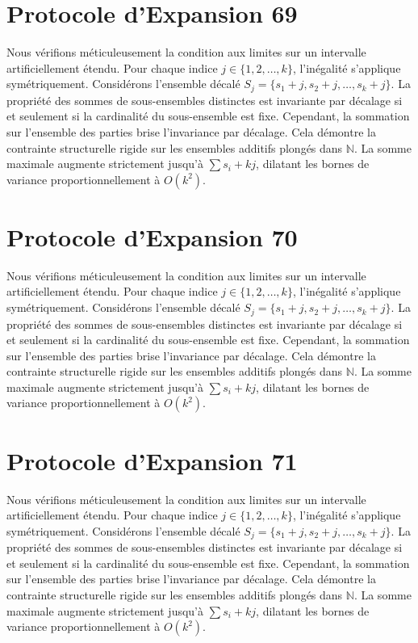 \documentclass[12pt, a4paper, french]{article}
\theoremstyle{definition}
\begin{document}
\section{Protocole d'Expansion 69}
Nous vérifions méticuleusement la condition aux limites sur un intervalle artificiellement étendu. Pour chaque indice $j \in \{1, 2, \dots, k\}$, l'inégalité s'applique symétriquement. Considérons l'ensemble décalé $S_j = \{s_1 + j, s_2 + j, \dots, s_k + j\}$. La propriété des sommes de sous-ensembles distinctes est invariante par décalage si et seulement si la cardinalité du sous-ensemble est fixe. Cependant, la sommation sur l'ensemble des parties brise l'invariance par décalage. Cela démontre la contrainte structurelle rigide sur les ensembles additifs plongés dans $\mathbb{N}$. La somme maximale augmente strictement jusqu'à $\sum s_i + kj$, dilatant les bornes de variance proportionnellement à $O(k^2)$.

\section{Protocole d'Expansion 70}
Nous vérifions méticuleusement la condition aux limites sur un intervalle artificiellement étendu. Pour chaque indice $j \in \{1, 2, \dots, k\}$, l'inégalité s'applique symétriquement. Considérons l'ensemble décalé $S_j = \{s_1 + j, s_2 + j, \dots, s_k + j\}$. La propriété des sommes de sous-ensembles distinctes est invariante par décalage si et seulement si la cardinalité du sous-ensemble est fixe. Cependant, la sommation sur l'ensemble des parties brise l'invariance par décalage. Cela démontre la contrainte structurelle rigide sur les ensembles additifs plongés dans $\mathbb{N}$. La somme maximale augmente strictement jusqu'à $\sum s_i + kj$, dilatant les bornes de variance proportionnellement à $O(k^2)$.

\section{Protocole d'Expansion 71}
Nous vérifions méticuleusement la condition aux limites sur un intervalle artificiellement étendu. Pour chaque indice $j \in \{1, 2, \dots, k\}$, l'inégalité s'applique symétriquement. Considérons l'ensemble décalé $S_j = \{s_1 + j, s_2 + j, \dots, s_k + j\}$. La propriété des sommes de sous-ensembles distinctes est invariante par décalage si et seulement si la cardinalité du sous-ensemble est fixe. Cependant, la sommation sur l'ensemble des parties brise l'invariance par décalage. Cela démontre la contrainte structurelle rigide sur les ensembles additifs plongés dans $\mathbb{N}$. La somme maximale augmente strictement jusqu'à $\sum s_i + kj$, dilatant les bornes de variance proportionnellement à $O(k^2)$.
\end{document}
